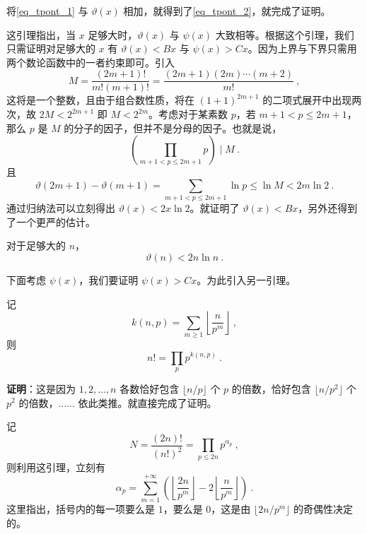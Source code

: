 将\autoref{eq_tpont_1} 与 $\vartheta(x)$ 相加，就得到了\autoref{eq_tpont_2}，就完成了证明。


这引理指出，当 $x$ 足够大时，$\vartheta(x)$ 与 $\psi(x)$ 大致相等。根据这个引理，我们只需证明对足够大的 $x$ 有 $\vartheta(x) < Bx$ 与 $\psi(x) > Cx$。因为上界与下界只需用两个数论函数中的一者约束即可。引入
\begin{equation}
M = \frac{(2m+1)!}{m! (m+1)!} = \frac{(2m+1)(2m)\cdots(m+2)}{m!} ~,
\end{equation}
这将是一个整数，且由于组合数性质，将在 $(1+1)^{2m+1}$ 的二项式展开中出现两次，故 $2M < 2^{2m+1}$ 即 $M < 2^{2m}$。考虑对于某素数 $p$，若 $m+1 < p \le 2m+1$，那么 $p$ 是 $M$ 的分子的因子，但并不是分母的因子。也就是说，
\begin{equation}
\left( \prod_{m+1 < p \le 2m+1} p \right) \mid M ~.
\end{equation}
且
\begin{equation}
\vartheta(2m+1) - \vartheta(m+1) = \sum_{m+1 < p \le 2m+1} \ln p \le \ln M < 2 m \ln 2 ~.
\end{equation}
通过归纳法可以立刻得出 $\vartheta(x) < 2x \ln 2$。就证明了 $\vartheta(x) < Bx$，另外还得到了一个更严的估计。
\begin{corollary}{}\label{cor_tpont_1}
对于足够大的 $n$，
\begin{equation}
\vartheta(n) < 2 n \ln n ~.
\end{equation}

\end{corollary}

下面考虑 $\psi(x)$，我们要证明 $\psi(x) > Cx$。为此引入另一引理。
\begin{lemma}{}
记 
\begin{equation}
k(n, p) = \sum_{m\ge 1} \left\lfloor  \frac{n}{p^m} \right\rfloor ~,
\end{equation}
则
\begin{equation}
n! = \prod_p p^{k(n, p)} ~.
\end{equation}

\end{lemma}
\textbf{证明}：这是因为 $1, 2, \dots, n$ 各数恰好包含 $\lfloor n/p \rfloor$ 个 $p$ 的倍数，恰好包含 $ \lfloor n/p^2 \rfloor$ 个 $p^2$ 的倍数，...... 依此类推。就直接完成了证明。 

记 
\begin{equation}
N = \frac{(2n)!}{(n!)^2} = \prod_{p \le 2n} p^{\alpha_p} ~,
\end{equation}
则利用这引理，立刻有
\begin{equation}\label{eq_tpont_4}
\alpha_p = \sum_{m=1}^{+\infty} \left( \left\lfloor \frac{2n}{p^m} \right\rfloor - 2  \left\lfloor \frac{n}{p^m} \right\rfloor\right) ~.
\end{equation}
这里指出，括号内的每一项要么是 $1$，要么是 $0$，这是由 $\lfloor 2n/p^m \rfloor$ 的奇偶性决定的。

